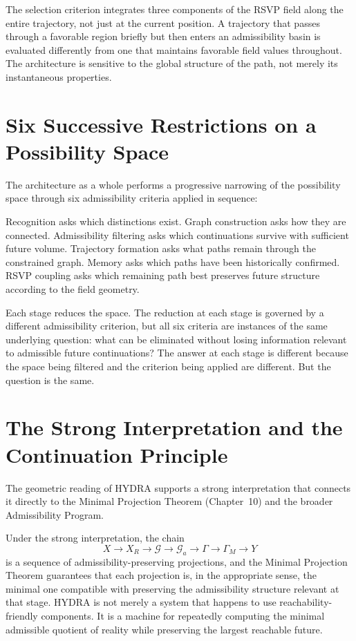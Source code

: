 \documentclass[12pt, oneside]{book}
\theoremstyle{flyxion}
\theoremstyle{definition}
\begin{document}
The selection criterion integrates three components of the RSVP field
along the entire trajectory, not just at the current position. A
trajectory that passes through a favorable region briefly but then
enters an admissibility basin is evaluated differently from one that
maintains favorable field values throughout. The architecture is
sensitive to the global structure of the path, not merely its
instantaneous properties.

\section{Six Successive Restrictions on a Possibility Space}

The architecture as a whole performs a progressive narrowing of
the possibility space through six admissibility criteria applied in
sequence:

Recognition asks which distinctions exist. Graph construction asks
how they are connected. Admissibility filtering asks which
continuations survive with sufficient future volume. Trajectory
formation asks what paths remain through the constrained graph.
Memory asks which paths have been historically confirmed. RSVP
coupling asks which remaining path best preserves future structure
according to the field geometry.

Each stage reduces the space. The reduction at each stage is governed
by a different admissibility criterion, but all six criteria are
instances of the same underlying question: what can be eliminated
without losing information relevant to admissible future continuations?
The answer at each stage is different because the space being
filtered and the criterion being applied are different. But the
question is the same.

\section{The Strong Interpretation and the Continuation Principle}

The geometric reading of HYDRA supports a strong interpretation
that connects it directly to the Minimal Projection Theorem
(Chapter~10) and the broader Admissibility Program.

Under the strong interpretation, the chain
\[
X \to X_R \to \mathcal{G} \to \mathcal{G}_a \to \Gamma \to \Gamma_M
  \to Y
\]
is a sequence of admissibility-preserving projections, and the
Minimal Projection Theorem guarantees that each projection is, in
the appropriate sense, the minimal one compatible with preserving
the admissibility structure relevant at that stage. HYDRA is not
merely a system that happens to use reachability-friendly components.
It is a machine for repeatedly computing the minimal admissible
quotient of reality while preserving the largest reachable future.
\end{document}
